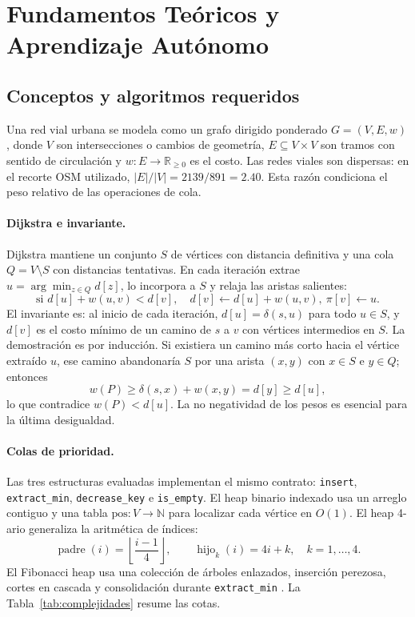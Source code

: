 \section{Fundamentos Teóricos y Aprendizaje Autónomo}
\label{sec:fundamentos}

\subsection{Conceptos y algoritmos requeridos}
Una red vial urbana se modela como un grafo dirigido ponderado $G=(V,E,w)$, donde $V$ son intersecciones o cambios de geometría, $E\subseteq V\times V$ son tramos con sentido de circulación y $w:E\to\mathbb{R}_{\ge 0}$ es el costo. Las redes viales son dispersas: en el recorte OSM utilizado, $|E|/|V|=2139/891=2.40$. Esta razón condiciona el peso relativo de las operaciones de cola.

\paragraph{Dijkstra e invariante.} Dijkstra mantiene un conjunto $S$ de vértices con distancia definitiva y una cola $Q=V\setminus S$ con distancias tentativas. En cada iteración extrae $u=\arg\min_{z\in Q}d[z]$, lo incorpora a $S$ y relaja las aristas salientes:
\begin{equation}
    \text{si } d[u]+w(u,v)<d[v],\quad d[v]\leftarrow d[u]+w(u,v),\ \pi[v]\leftarrow u.
    \label{eq:relajacion}
\end{equation}
El invariante es: al inicio de cada iteración, $d[u]=\delta(s,u)$ para todo $u\in S$, y $d[v]$ es el costo mínimo de un camino de $s$ a $v$ con vértices intermedios en $S$. La demostración es por inducción. Si existiera un camino más corto hacia el vértice extraído $u$, ese camino abandonaría $S$ por una arista $(x,y)$ con $x\in S$ e $y\in Q$; entonces
\begin{equation}
    w(P)\ge \delta(s,x)+w(x,y)=d[y]\ge d[u],
    \label{eq:prueba_dijkstra}
\end{equation}
lo que contradice $w(P)<d[u]$. La no negatividad de los pesos es esencial para la última desigualdad.

\paragraph{Colas de prioridad.} Las tres estructuras evaluadas implementan el mismo contrato: \texttt{insert}, \texttt{extract\_min}, \texttt{decrease\_key} e \texttt{is\_empty}. El heap binario indexado usa un arreglo contiguo y una tabla $\text{pos}:V\to\mathbb{N}$ para localizar cada vértice en $O(1)$. El heap 4-ario generaliza la aritmética de índices:
\begin{equation}
    \operatorname{padre}(i)=\left\lfloor\frac{i-1}{4}\right\rfloor,\qquad \operatorname{hijo}_k(i)=4i+k,\quad k=1,\dots,4.
    \label{eq:aritmetica_4ary}
\end{equation}
El Fibonacci heap usa una colección de árboles enlazados, inserción perezosa, cortes en cascada y consolidación durante \texttt{extract\_min} \parencite{fredman1987fibonacci}. La Tabla~\ref{tab:complejidades} resume las cotas.

